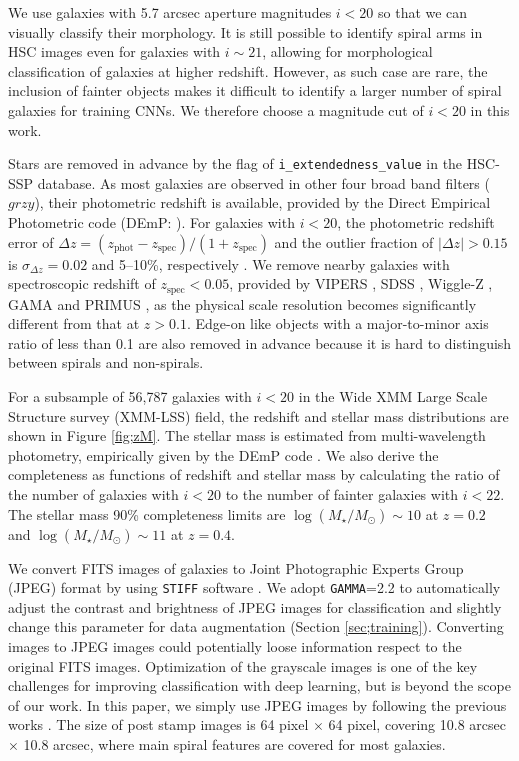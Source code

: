 \documentclass[a4paper,fleqn,usenatbib]{mnras}
\begin{document}
We use galaxies with 5.7 arcsec aperture magnitudes $i<20$ so that we can visually classify their morphology.
It is still possible to identify spiral arms in HSC images even for galaxies with $i\sim21$, allowing for morphological classification of galaxies at higher redshift.
However, as such case are rare, the inclusion of fainter objects makes it difficult to identify a larger number of spiral galaxies for training CNNs.
We therefore choose a magnitude cut of $i<20$ in this work.

Stars are removed in advance by the flag of {\tt i\_extendedness\_value} in the HSC-SSP database.
As most galaxies are observed in other four broad band filters ($grzy$), their photometric redshift is available, provided by the Direct Empirical Photometric code (DEmP: \citealt{2014ApJ...792..102H}).
For galaxies with $i < 20$, the photometric redshift error of $\Delta z=(z_\mathrm{phot}-z_\mathrm{spec})/(1+z_\mathrm{spec})$ and the outlier fraction of $|\Delta z|>0.15$ is $\sigma_{\Delta z}=0.02$ and 5--10\%, respectively \citep{2018PASJ...70S...9T,2020arXiv200301511N}.
We remove nearby galaxies with spectroscopic redshift of $z_\mathrm{spec}<0.05$, provided by VIPERS \citep{2014A&A...562A..23G}, SDSS \citep{2015ApJS..219...12A}, Wiggle-Z \citep{2010MNRAS.401.1429D}, GAMA \citep{2015MNRAS.452.2087L} and PRIMUS \citep{2013ApJ...767..118C}, as the physical scale resolution becomes significantly different from that at $z>0.1$.
Edge-on like objects with a major-to-minor axis ratio of less than 0.1 are also removed in advance because it is hard to distinguish between spirals and non-spirals.

For a subsample of 56,787 galaxies with $i < 20$ in the Wide XMM Large Scale Structure survey (XMM-LSS) field, the redshift and stellar mass distributions are shown in Figure \ref{fig;zM}.
The stellar mass is estimated from multi-wavelength photometry, empirically given by the DEmP code \citep{2014ApJ...792..102H}. 
We also derive the completeness as functions of redshift and stellar mass by calculating the ratio of the number of galaxies with $i<20$ to the number of fainter galaxies with $i<22$. 
The stellar mass 90\% completeness limits are $\log(M_\star/M_\odot)\sim10$ at $z=0.2$ and $\log(M_\star/M_\odot)\sim11$ at $z=0.4$.


We convert FITS images of galaxies to Joint Photographic Experts Group (JPEG) format by using {\tt STIFF} software \citep{2012ASPC..461..263B}.
We adopt {\tt GAMMA}=2.2 to automatically adjust the contrast and brightness of JPEG images for classification and slightly change this parameter for data augmentation (Section \ref{sec;training}).
Converting images to JPEG images could potentially loose information respect to the original FITS images.
Optimization of the grayscale images is one of the key challenges for improving classification with deep learning, but is beyond the scope of our work.
In this paper, we simply use JPEG images by following the previous works \citep[e.g.,][]{2015MNRAS.450.1441D,2015ApJS..221....8H, 2018MNRAS.476.3661D, 2018MNRAS.477..894A}. 
The size of post stamp images is 64 pixel $\times$ 64 pixel, covering 10.8 arcsec $\times$ 10.8 arcsec, where main spiral features are covered for most galaxies.
\end{document}
